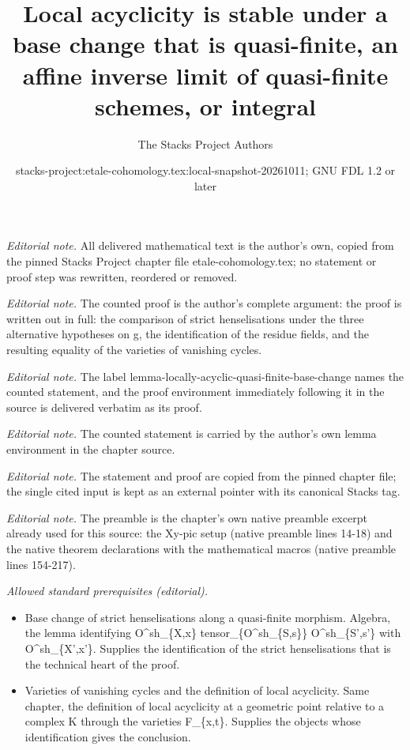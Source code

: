 \documentclass[10pt,a4paper]{amsart}
\title{Local acyclicity is stable under a base change that is quasi-finite, an affine inverse limit of quasi-finite schemes, or integral}
\author{The Stacks Project Authors}
\date{stacks-project:etale-cohomology.tex:local-snapshot-20261011; GNU FDL 1.2 or later}
\theoremstyle{plain}
\theoremstyle{definition}
\theoremstyle{remark}
\numberwithin{equation}{subsection}
\begin{document}
\maketitle
\noindent\textit{Editorial note.} All delivered mathematical text is the author's own, copied from the pinned Stacks Project chapter file etale-cohomology.tex; no statement or proof step was rewritten, reordered or removed.\par\medskip
\noindent\textit{Editorial note.} The counted proof is the author's complete argument: the proof is written out in full: the comparison of strict henselisations under the three alternative hypotheses on g, the identification of the residue fields, and the resulting equality of the varieties of vanishing cycles.\par\medskip
\noindent\textit{Editorial note.} The label lemma-locally-acyclic-quasi-finite-base-change names the counted statement, and the proof environment immediately following it in the source is delivered verbatim as its proof.\par\medskip
\noindent\textit{Editorial note.} The counted statement is carried by the author's own lemma environment in the chapter source.\par\medskip
\noindent\textit{Editorial note.} The statement and proof are copied from the pinned chapter file; the single cited input is kept as an external pointer with its canonical Stacks tag.\par\medskip
\noindent\textit{Editorial note.} The preamble is the chapter's own native preamble excerpt already used for this source: the Xy-pic setup (native preamble lines 14-18) and the native theorem declarations with the mathematical macros (native preamble lines 154-217).\par\medskip
\noindent\textit{Allowed standard prerequisites (editorial).}\begin{itemize}
\item Base change of strict henselisations along a quasi-finite morphism. Algebra, the lemma identifying O\textasciicircum{}sh\_\{X,x\} tensor\_\{O\textasciicircum{}sh\_\{S,s\}\} O\textasciicircum{}sh\_\{S',s'\} with O\textasciicircum{}sh\_\{X',x'\}. Supplies the identification of the strict henselisations that is the technical heart of the proof.
\item Varieties of vanishing cycles and the definition of local acyclicity. Same chapter, the definition of local acyclicity at a geometric point relative to a complex K through the varieties F\_\{x,t\}. Supplies the objects whose identification gives the conclusion.
\end{itemize}\medskip
\end{document}
